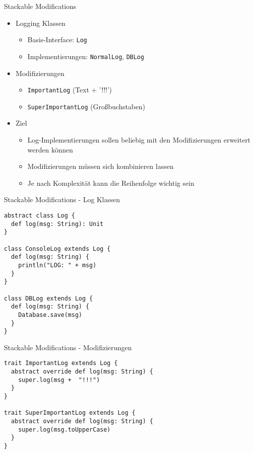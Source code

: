 \begin{frame}[fragile]{Stackable Modifications}
\begin{itemize}
	\item Logging Klassen
		\begin{itemize}
			\item Basis-Interface: \verb!Log!
			\item Implementierungen: \verb!NormalLog!, \verb!DBLog!
		\end{itemize}
		\pause
	\item Modifizierungen
		\begin{itemize}
			\item \verb!ImportantLog! (Text + '!!!')
			\item \verb!SuperImportantLog! (Großbuchstaben)
		\end{itemize}
		\pause
	\item Ziel
		\begin{itemize}
			\item Log-Implementierungen sollen beliebig mit den Modifizierungen erweitert werden können
			\item Modifizierungen müssen sich kombinieren lassen
			\item Je nach Komplexität kann die Reihenfolge wichtig sein
		\end{itemize}
\end{itemize}
\end{frame}


\begin{frame}[fragile]{Stackable Modifications - Log Klassen}
\begin{lstlisting}
abstract class Log {
  def log(msg: String): Unit
}

class ConsoleLog extends Log {
  def log(msg: String) {
    println("LOG: " + msg)
  }
}

class DBLog extends Log {
  def log(msg: String) {
    Database.save(msg)
  }
}
\end{lstlisting}
\end{frame}


\begin{frame}[fragile]{Stackable Modifications - Modifizierungen}
\begin{lstlisting}
trait ImportantLog extends Log {
  abstract override def log(msg: String) {
    super.log(msg +  "!!!")
  }
}

trait SuperImportantLog extends Log {
  abstract override def log(msg: String) {
    super.log(msg.toUpperCase)
  }
}
\end{lstlisting}
\end{frame}

